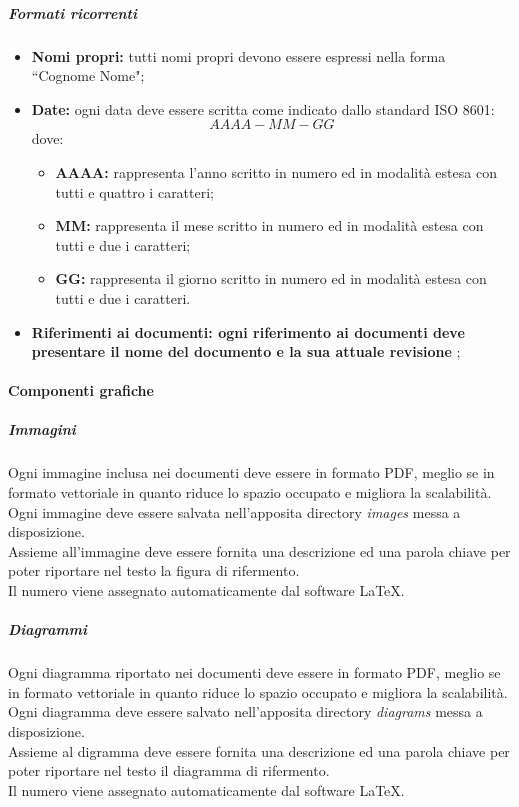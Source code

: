 				\subparagraph{Formati ricorrenti}
				\begin{itemize}
					\item \textbf{Nomi propri:} tutti nomi propri devono essere espressi nella forma ``Cognome Nome";
					\item \textbf{Date:} ogni data deve essere scritta come indicato dallo standard ISO 8601:\\
						\begin{displaymath}
							AAAA-MM-GG
						\end{displaymath}
						dove:
						\begin{itemize}
							\item \textbf{AAAA:} rappresenta l'anno scritto in numero ed in modalità estesa con tutti e quattro i caratteri;
							\item \textbf{MM:} rappresenta il mese scritto in numero ed in modalità estesa con tutti e due i caratteri;
							\item \textbf{GG:} rappresenta il giorno scritto in numero ed in modalità estesa con tutti e due i caratteri.
						\end{itemize}
						\item \textbf{Riferimenti ai documenti: ogni riferimento ai documenti deve presentare il nome del documento e la sua attuale revisione} ;
				\end{itemize}

			\paragraph{Componenti grafiche}
				
				\subparagraph{Immagini}
				Ogni immagine inclusa nei documenti deve essere in formato PDF, meglio se in formato vettoriale in quanto riduce lo spazio occupato e migliora la scalabilità.\\
				Ogni immagine deve essere salvata nell'apposita directory \emph{images} messa a disposizione.\\
				Assieme all'immagine deve essere fornita una descrizione ed una parola chiave per poter riportare nel testo la figura di rifermento.\\
				Il numero viene assegnato automaticamente dal software \LaTeX.

				\subparagraph{Diagrammi}
				Ogni diagramma riportato nei documenti deve essere in formato PDF, meglio se in formato vettoriale in quanto riduce lo spazio occupato e migliora la scalabilità.\\
				Ogni diagramma deve essere salvato nell'apposita directory \emph{diagrams} messa a disposizione.\\
				Assieme al digramma deve essere fornita una descrizione ed una parola chiave per poter riportare nel testo il diagramma di rifermento.\\
				Il numero viene assegnato automaticamente dal software \LaTeX.
				
